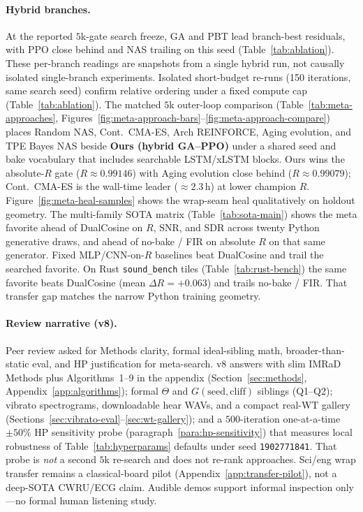 \paragraph{Hybrid branches.}
At the reported $5$k-gate search freeze, GA and PBT lead branch-best residuals, with PPO close behind and NAS trailing on this seed (Table~\ref{tab:ablation}).
These per-branch readings are snapshots from a single hybrid run, not causally isolated single-branch experiments.
Isolated short-budget re-runs (150 iterations, same search seed) confirm relative ordering under a fixed compute cap (Table~\ref{tab:ablation}).
The matched $5$k outer-loop comparison (Table~\ref{tab:meta-approaches}, Figures~\ref{fig:meta-approach-bars}--\ref{fig:meta-approach-compare}) places Random NAS, Cont.\ CMA-ES, Arch REINFORCE, Aging evolution, and TPE Bayes NAS beside \textbf{Ours (hybrid GA--PPO)} under a shared seed and bake vocabulary that includes searchable LSTM/xLSTM blocks.
Ours wins the absolute-$R$ gate ($R\approx 0.99146$) with Aging evolution close behind ($R\approx 0.99079$); Cont.\ CMA-ES is the wall-time leader ($\approx 2.3$\,h) at lower champion $R$.
Figure~\ref{fig:meta-heal-samples} shows the wrap-seam heal qualitatively on holdout geometry.
The multi-family SOTA matrix (Table~\ref{tab:sota-main}) shows the meta favorite ahead of DualCosine on $R$, SNR, and SDR across twenty Python generative draws, and ahead of no-bake / FIR on absolute $R$ on that same generator.
Fixed MLP/CNN-on-$R$ baselines beat DualCosine and trail the searched favorite.
On Rust \texttt{sound\_bench} tiles (Table~\ref{tab:rust-bench}) the same favorite beats DualCosine (mean $\Delta R={+}0.063$) and trails no-bake / FIR. That transfer gap matches the narrow Python training geometry.

\paragraph{Review narrative (v8).}
Peer review asked for Methods clarity, formal ideal-sibling math, broader-than-static eval, and HP justification for meta-search.
v8 answers with slim IMRaD Methods plus Algorithms~1--9 in the appendix (Section~\ref{sec:methods}, Appendix~\ref{app:algorithms}); formal $\Theta$ and $G(\mathrm{seed},\mathrm{cliff})$ siblings (Q1--Q2); vibrato spectrograms, downloadable hear WAVs, and a compact real-WT gallery (Sections~\ref{sec:vibrato-eval}--\ref{sec:wt-gallery}); and a $500$-iteration one-at-a-time $\pm 50\%$ HP sensitivity probe (paragraph~\ref{para:hp-sensitivity}) that measures local robustness of Table~\ref{tab:hyperparams} defaults under seed \texttt{1902771841}.
That probe is \emph{not} a second $5$k re-search and does not re-rank approaches.
Sci/eng wrap transfer remains a classical-board pilot (Appendix~\ref{app:transfer-pilot}), not a deep-SOTA CWRU/ECG claim.
Audible demos support informal inspection only---no formal human listening study.
